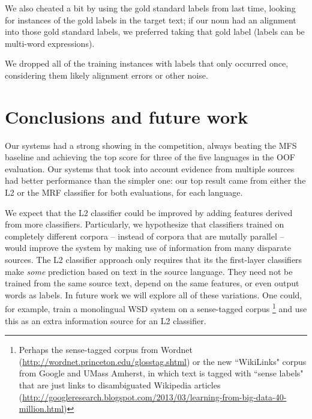 \documentclass[11pt,letterpaper]{article}
\begin{document}
We also cheated a bit by using the gold standard labels from last time, looking
for instances of the gold labels in the target text; if our noun had an
alignment into those gold standard labels, we preferred taking that gold label
(labels can be multi-word expressions).

We dropped all of the training instances with labels that only occurred once,
considering them likely alignment errors or other noise.

\section{Conclusions and future work}
Our systems had a strong showing in the competition, always beating the MFS
baseline and achieving the top score for three of the five languages in the OOF
evaluation. Our systems that took into account evidence from multiple sources
had better performance than the simpler one: our top result came from either
the L2 or the MRF classifier for both evaluations, for each language.

We expect that the L2 classifier could be improved by adding features derived
from more classifiers. Particularly, we hypothesize that classifiers trained on
completely different corpora -- instead of corpora that are mutally parallel --
would improve the system by making use of information from many disparate
sources. The L2 classifier approach only requires that its the first-layer
classifiers make \emph{some} prediction based on text in the source language.
They need not be trained from the same source text, depend on the same
features, or even output words as labels. In future work we will explore
all of these variations. One could, for example, train a monolingual WSD system
on a sense-tagged corpus \footnote{Perhaps the sense-tagged corpus from Wordnet
(\url{http://wordnet.princeton.edu/glosstag.shtml})
or the new ``WikiLinks" corpus from Google and UMass Amherst, in which text is
tagged with ``sense labels" that are just links to disambiguated Wikipedia
articles
(\url{http://googleresearch.blogspot.com/2013/03/learning-from-big-data-40-million.html})}
and use this as an extra information source for an L2 classifier.

\end{document}
